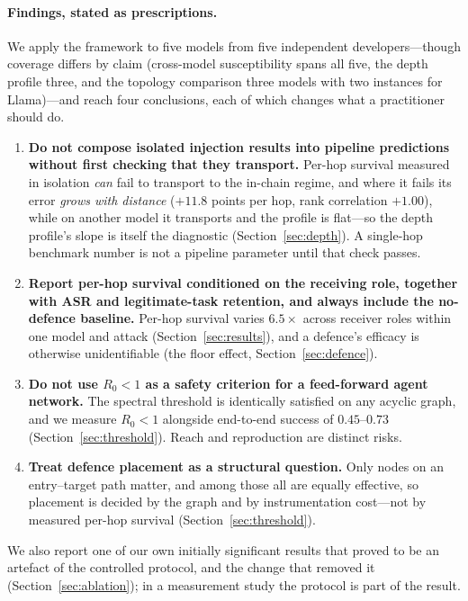 \documentclass[sigconf,anonymous]{aamas}
\begin{document}
\paragraph{Findings, stated as prescriptions.} We apply the framework to five models
from five independent developers---though coverage differs by claim (cross-model
susceptibility spans all five, the depth profile three, and the topology comparison
three models with two instances for Llama)---and reach four conclusions, each of which
changes what a practitioner should do.

\begin{enumerate}
\item \textbf{Do not compose isolated injection results into pipeline
predictions without first checking that they transport.} Per-hop survival measured
in isolation \emph{can} fail to transport to the in-chain regime, and where it fails
its error \emph{grows with distance} ($+11.8$ points per hop, rank correlation
$+1.00$), while on another model it transports and the profile is flat---so the depth
profile's slope is itself the diagnostic (Section~\ref{sec:depth}). A single-hop
benchmark number is not a pipeline parameter until that check passes.
\item \textbf{Report per-hop survival conditioned on the receiving role, together
with ASR and legitimate-task retention, and always include the no-defence
baseline.} Per-hop survival varies $6.5\times$ across receiver roles within one
model and attack (Section~\ref{sec:results}), and a defence's efficacy is otherwise
unidentifiable (the floor effect, Section~\ref{sec:defence}).
\item \textbf{Do not use $R_0 < 1$ as a safety criterion for a feed-forward agent
network.} The spectral threshold is identically satisfied on any acyclic graph, and
we measure $R_0 < 1$ alongside end-to-end success of $0.45$--$0.73$
(Section~\ref{sec:threshold}). Reach and reproduction are distinct risks.
\item \textbf{Treat defence placement as a structural question.} Only nodes on an
entry--target path matter, and among those all are equally effective, so placement
is decided by the graph and by instrumentation cost---not by measured per-hop
survival (Section~\ref{sec:threshold}).
\end{enumerate}

We also report one of our own initially significant results that proved to be an
artefact of the controlled protocol, and the change that removed it
(Section~\ref{sec:ablation}); in a measurement study the protocol is part of the
result.
\end{document}
